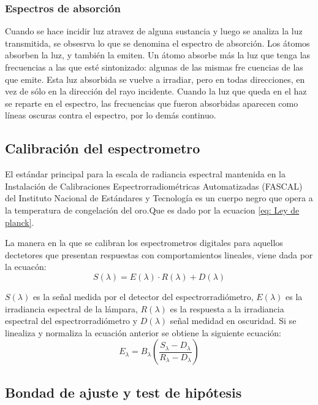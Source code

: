 \documentclass[twocolumn]{article}
\begin{document}
\subsubsection{Espectros de absorción}
Cuando se hace incidir luz atravez de alguna sustancia y luego se analiza la luz transmitida, se obsesrva lo que se denomina el espectro de absorción.
Los átomos absorben la luz, y también la emiten. Un átomo absorbe más la
luz que tenga las frecuencias a las que esté sintonizado: algunas de las mismas fre
cuencias de las que emite. Esta
luz absorbida se vuelve a irradiar, pero en todas direcciones, en vez de sólo en la
dirección del rayo incidente. Cuando la luz que queda en el haz se reparte en
el espectro, las frecuencias que fueron absorbidas aparecen como líneas oscuras
contra el espectro, por lo demás continuo.\cite{Hewitt2007Conceptual}

\subsection{Calibración del espectrometro}
El estándar principal para la escala de radiancia espectral mantenida en la Instalación de Calibraciones Espectrorradiométricas Automatizadas (FASCAL) del Instituto Nacional de Estándares y Tecnología es un cuerpo negro que opera a la temperatura de congelación del oro.\cite{Early1996Irradiance}Que es dado por la ecuacion \ref{eq: Ley de planck}.

La manera en la que se calibran los espectrometros digitales para aquellos dectetores que presentan respuestas con comportamientos lineales, viene dada por la ecuacón:
\[
    S(\lambda)= E(\lambda)\cdot R(\lambda) + D(\lambda)
\]

$S(\lambda)$ es la señal medida por el detector del espectrorradiómetro, $E(\lambda)$ es la irradiancia espectral de la lámpara, $R(\lambda)$ es la respuesta a la irradiancia espectral del espectrorradiómetro y $D(\lambda)$ señal medidad en oscuridad. \cite{Rammeloo2023Spectroradiometer}
Si se linealiza y normaliza la ecuación anterior se obtiene la siguiente ecuación:
\begin{equation}
    E_{\lambda}= B_{\lambda}(\frac{S_{\lambda}-D_{\lambda}}{R_{\lambda}-D_{\lambda}})
    \label{eq: ecuación de transferencia radiométrica relativa}
\end{equation}


\subsection{Bondad de ajuste y test de hipótesis}
\end{document}
